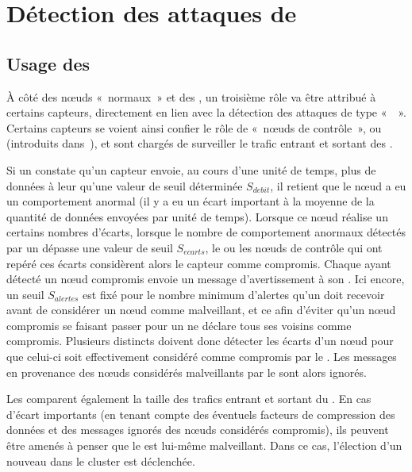 \section{Détection des attaques de \dds}
\label{sa:sec:detection}
    \subsection{Usage des \cns}

À côté des nœuds «~normaux~» et des \chs, un troisième rôle va être attribué à certains capteurs, directement en lien avec la détection des attaques de type «~\dds~».
Certains capteurs se voient ainsi confier le rôle de «~nœuds de contrôle~», ou \cns (introduits dans~\cite{LC08}), et sont chargés de surveiller le trafic entrant et sortant des \chs.

Si un \cn constate qu'un capteur envoie, au cours d'une unité de temps, plus de données à leur \CH qu'une valeur de seuil déterminée $S_{debit}$, il retient que le nœud a eu un comportement anormal (il y a eu un écart important à la moyenne de la quantité de données envoyées par unité de temps).
Lorsque ce nœud réalise un certains nombres d'écarts, \cad lorsque le nombre de comportement anormaux détectés par un \cn dépasse une valeur de seuil $S_{ecarts}$, le ou les nœuds de contrôle qui ont repéré ces écarts considèrent alors le capteur comme compromis.
Chaque \cn ayant détecté un nœud compromis envoie un message d'avertissement à son \ch.
Ici encore, un seuil $S_{alertes}$ est fixé pour le nombre minimum d'alertes qu'un \CH doit recevoir avant de considérer un nœud comme malveillant, et ce afin d'éviter qu'un nœud compromis se faisant passer pour un \cn ne déclare tous ses voisins comme compromis.
Plusieurs \cns distincts doivent donc détecter les écarts d'un nœud pour que celui-ci soit effectivement considéré comme compromis par le \ch.
Les messages en provenance des nœuds considérés malveillants par le \ch sont alors ignorés.

Les \cns comparent également la taille des trafics entrant et sortant du \ch.
En cas d'écart importants (en tenant compte des éventuels facteurs de compression des données et des messages ignorés des nœuds considérés compromis), ils peuvent être amenés à penser que le \ch est lui-même malveillant.
Dans ce cas, l'élection d'un nouveau \CH dans le cluster est déclenchée.

